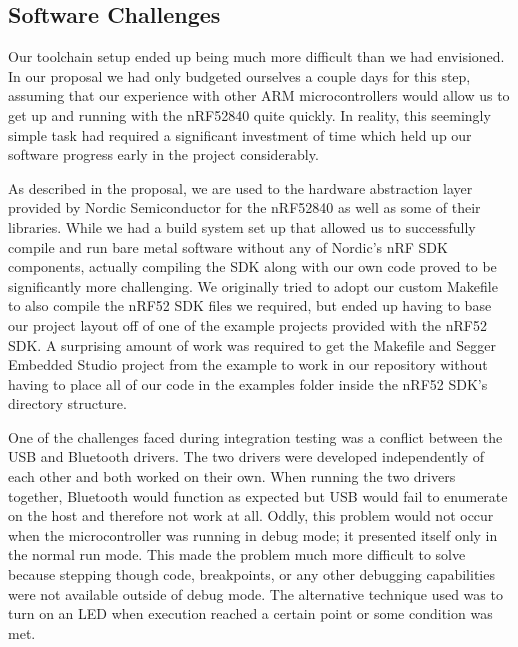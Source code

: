 \subsection{Software Challenges}

Our toolchain setup ended up being much more difficult than we had envisioned.
In our proposal we had only budgeted ourselves a couple days for this step,
assuming that our experience with other ARM microcontrollers would allow us to
get up and running with the nRF52840 quite quickly. In reality, this seemingly
simple task had required a significant investment of time which held up our
software progress early in the project considerably.

As described in the proposal,
we are used to the hardware abstraction layer provided by Nordic
Semiconductor for the nRF52840 as well as some of their libraries. While we had
a build system set up that allowed us to successfully compile and run bare metal
software without any of Nordic's nRF SDK components, actually compiling the SDK 
along with our own code proved to be significantly more challenging. We 
originally tried to adopt our custom Makefile to also compile the nRF52 SDK files 
we required, but ended up having to base our project layout off of one of the 
example projects provided with the nRF52 SDK. A surprising amount of work was 
required to get the Makefile and Segger Embedded Studio project from the example 
to work in our repository without having to place all of our code in the examples 
folder inside the nRF52 SDK's directory structure.

One of the challenges faced during integration testing was a conflict between 
the USB and Bluetooth drivers. The two drivers were developed independently of
each other and both worked on their own. When running the two drivers together,
Bluetooth would function as expected but USB would fail to enumerate on the host
and therefore not work at all. Oddly, this problem would not occur when the 
microcontroller was running in debug mode; it presented itself only in the 
normal run mode. This made the problem much more difficult to solve because
stepping though code, breakpoints, or any other debugging capabilities were not
available outside of debug mode. The alternative technique used was to turn on 
an LED when execution reached a certain point or some condition was met. 

